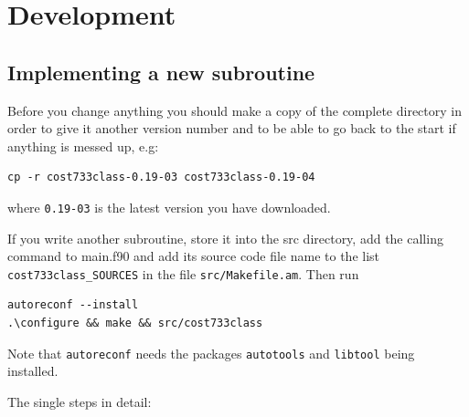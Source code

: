 \documentclass[12pt, oneside, a4paper, headsepline, plainheadsepline]{scrbook}
\begin{document}
\chapter{Development}


\section{Implementing a new subroutine}

Before you change anything you should make a copy of the complete directory 
in order to give it another version number and to be able to go back to the start if 
anything is messed up, e.g:
\begin{lstlisting}
cp -r cost733class-0.19-03 cost733class-0.19-04
\end{lstlisting}
where \verb+0.19-03+ is the latest version you have downloaded.

If you write another subroutine, store it into the src directory, 
add the calling command to main.f90 and
add its source code file name to the list \verb+cost733class_SOURCES+ in the file
\verb+src/Makefile.am+. Then run
\begin{lstlisting}
autoreconf --install 
.\configure && make && src/cost733class
\end{lstlisting}
Note that \verb+autoreconf+ needs the packages \verb+autotools+ and \verb+libtool+ being installed.


The single steps in detail:
\end{document}
